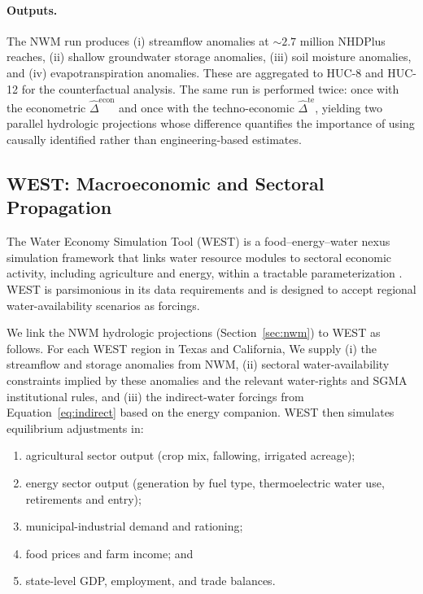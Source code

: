 \documentclass[11pt, letterpaper]{article}
\begin{document}
\paragraph{Outputs.} The NWM run produces (i) streamflow anomalies at $\sim 2.7$ million NHDPlus reaches, (ii) shallow groundwater storage anomalies, (iii) soil moisture anomalies, and (iv) evapotranspiration anomalies. These are aggregated to HUC-8 and HUC-12 for the counterfactual analysis. The same run is performed twice: once with the econometric $\widehat{\Delta}^{\text{econ}}$ and once with the techno-economic $\widehat{\Delta}^{\text{te}}$, yielding two parallel hydrologic projections whose difference quantifies the importance of using causally identified rather than engineering-based estimates.

\subsection{WEST: Macroeconomic and Sectoral Propagation}
\label{sec:west}

The Water Economy Simulation Tool (WEST) is a food--energy--water nexus simulation framework that links water resource modules to sectoral economic activity, including agriculture and energy, within a tractable parameterization \citep{reimer2020west}. WEST is parsimonious in its data requirements and is designed to accept regional water-availability scenarios as forcings.

We link the NWM hydrologic projections (Section~\ref{sec:nwm}) to WEST as follows. For each WEST region in Texas and California, We supply (i) the streamflow and storage anomalies from NWM, (ii) sectoral water-availability constraints implied by these anomalies and the relevant water-rights and SGMA institutional rules, and (iii) the indirect-water forcings from Equation~\eqref{eq:indirect} based on the energy companion. WEST then simulates equilibrium adjustments in:
\begin{enumerate}[label=(\roman*)]
\item agricultural sector output (crop mix, fallowing, irrigated acreage);
\item energy sector output (generation by fuel type, thermoelectric water use, retirements and entry);
\item municipal-industrial demand and rationing;
\item food prices and farm income; and
\item state-level GDP, employment, and trade balances.
\end{enumerate}
\end{document}
